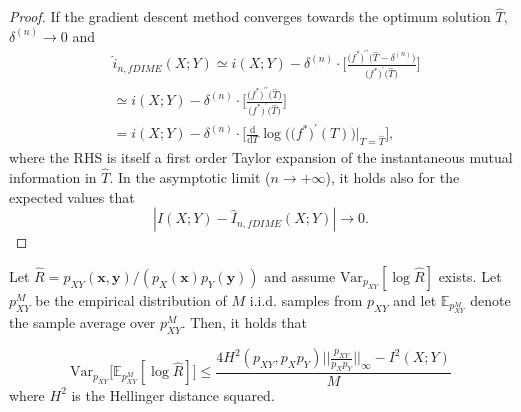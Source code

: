 \begin{proof}
If the gradient descent method converges towards the optimum solution $\hat{T}$, $\delta^{(n)} \rightarrow 0$ and 
\begin{align}
& \hat{i}_{n,fDIME}(X;Y) \simeq i(X;Y) - \delta^{(n)} \cdot \Biggl[\frac{\bigl(f^{*}\bigr)^{\prime \prime}\bigl(\hat{T}-\delta^{(n)}\bigr)}{\bigl(f^{*}\bigr)^{\prime}\bigl(\hat{T}\bigr)} \Biggr] \nonumber \\ 
& \simeq i(X;Y) - \delta^{(n)} \cdot \Biggl[\frac{\bigl(f^{*}\bigr)^{\prime \prime}\bigl(\hat{T}\bigr)}{\bigl(f^{*}\bigr)^{\prime}\bigl(\hat{T}\bigr)} \Biggr] \nonumber \\
& = i(X;Y) - \delta^{(n)} \cdot \Biggl[\frac{\mathrm{d}}{\mathrm{d}T} \log \bigl( \bigl(f^{*}\bigr)^{\prime}(T)\bigr) \biggr|_{T=\hat{T}} \Biggr],
\end{align}
where the RHS is itself a first order Taylor expansion of the instantaneous mutual information in $\hat{T}$. 
In the asymptotic limit ($n\rightarrow +\infty$), it holds also for the expected values that 
\begin{equation}
|I(X;Y)-\hat{I}_{n,fDIME}(X;Y)|\rightarrow 0.
\end{equation}
\end{proof}

\begin{lemma}
Let $\hat{R} = p_{XY}(\mathbf{x},\mathbf{y})/ (p_{X}(\mathbf{x}) p_Y(\mathbf{y}))$ and assume $\text{Var}_{p_{XY}}[\log \hat{R}]$ exists. Let $p^M_{XY}$ be the empirical distribution of $M$ i.i.d. samples from $p_{XY}$ and let $\mathbb{E}_{p^M_{XY}}$ denote the sample average over $p^M_{XY}$. Then, it holds that

\begin{equation}
\text{Var}_{p_{XY}}\bigl[\mathbb{E}_{p^M_{XY}} [\log \hat{R}] \bigr] \leq \frac{ 4H^2(p_{XY},p_Xp_Y)\biggl|\biggl|\frac{p_{XY}}{p_Xp_Y}\biggr|\biggr|_{\infty}-I^2(X;Y)}{M}
\end{equation}
where $H^2$ is the Hellinger distance squared.
\end{lemma}

